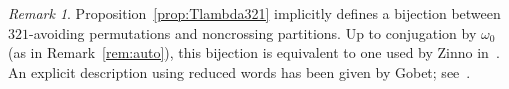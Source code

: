 \documentclass[submission]{FPSAC2024}
\newtheorem{prop}[equation]{Proposition}
\theoremstyle{definition}
\theoremstyle{remark}
\newtheorem{rem}[equation]{Remark}
\numberwithin{equation}{section}
\begin{document}
\begin{rem}
Proposition~\ref{prop:Tlambda321} implicitly defines a bijection between $321$-avoiding permutations and noncrossing partitions.  Up to conjugation by $\omega_{0}$ (as in Remark~\ref{rem:auto}), this bijection is equivalent to one used by Zinno in~\cite{Z02}.  An explicit description using reduced words has been given by Gobet; see~\cite{Gobet}.
\end{rem}

%
%
%
\end{document}
